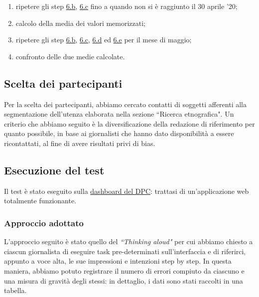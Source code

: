 \begin{enumerate}
\begin{enumerate}[label=\alph*.]
        \item ripetere gli step \hyperref[at:b]{6.b}, \hyperref[at:c]{6.c} fino a quando non si è raggiunto il 30 aprile '20; \label{at:d}
        \item calcolo della media dei valori memorizzati; \label{at:e}
        \item ripetere gli step \hyperref[at:b]{6.b}, \hyperref[at:c]{6.c}, \hyperref[at:d]{6.d} ed \hyperref[at:e]{6.e} per il mese di maggio; 
        \item confronto delle due medie calcolate.
    \end{enumerate}
\end{enumerate}

\subsection{Scelta dei partecipanti}
\label{ss:seclta-partecipanti}
Per la scelta dei partecipanti, abbiamo cercato contatti di soggetti afferenti alla segmentazione dell'utenza elaborata nella sezione ``Ricerca etnografica". Un criterio che abbiamo seguito è la diversificazione della redazione di riferimento per quanto possibile, in base ai giornalisti che hanno dato disponibilità a essere ricontattati, al fine di avere risultati privi di bias.

\subsection{Esecuzione del test}
\label{ss:vre-esecuzione-test}
Il test è stato eseguito sulla \href{https://opendatadpc.maps.arcgis.com/apps/opsdashboard/index.html#/b0c68bce2cce478eaac82fe38d4138b1}{dashboard del DPC}: trattasi di un'applicazione web totalmente funzionante.
\subsubsection{Approccio adottato}
\label{sss:approccio-adottato}
L'approccio seguito è stato quello del \textit{``Thinking aloud"} per cui abbiamo chiesto a ciascun giornalista di eseguire task pre-determinati sull'interfaccia e di riferirci, appunto a voce alta, le sue impressioni e intenzioni step by step.
\noindent
In questa maniera, abbiamo potuto registrare il numero di errori compiuto da ciascuno e una misura di gravità degli stessi: in dettaglio, i dati sono stati raccolti in una tabella.

